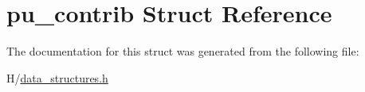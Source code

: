 \hypertarget{structpu__contrib}{
\section{pu\_\-contrib Struct Reference}
\label{structpu__contrib}
}


The documentation for this struct was generated from the following file:\begin{DoxyCompactItemize}
\item 
H/\hyperlink{data__structures_8h}{data\_\-structures.h}\end{DoxyCompactItemize}
